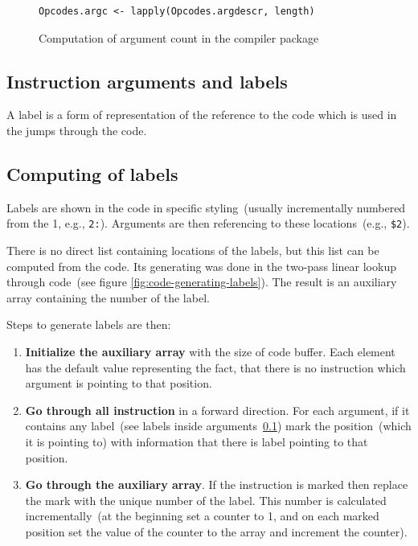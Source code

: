 \documentclass[thesis=M,english]{FITthesis}[2018/10/20]
\newcommand{\code}[1]{\texttt{#1}}
\begin{document}
\begin{figure}[!h]
\begin{lstlisting}
Opcodes.argc <- lapply(Opcodes.argdescr, length)
\end{lstlisting}
	\caption{Computation of argument count in the compiler package}\label{fig:computation-of-argc}
\end{figure}

\subsection{Instruction arguments and labels}\label{instruction-arguments-labels}

A label is a form of representation of the reference to the code which is used in the jumps through the code.

\subsection{Computing of labels}

Labels are shown in the code in specific styling~(usually incrementally numbered from the 1, e.g., \code{2:}). Arguments are then referencing to these locations~(e.g., \code{{\$}2}).

There is no direct list containing locations of the labels, but this list can be computed from the code. Its generating was done in the two-pass linear lookup through code~(see figure \ref{fig:code-generating-labels}). The result is an auxiliary array containing the number of the label.

Steps to generate labels are then:
\begin{enumerate}
	\item \textbf{Initialize the auxiliary array} with the size of code buffer. Each element has the default value representing the fact, that there is no instruction which argument is pointing to that position.
	\item \textbf{Go through all instruction} in a forward direction. For each argument, if it contains any label~(see labels inside arguments~\ref{instruction-arguments-labels}) mark the position~(which it is pointing to) with information that there is label pointing to that position.
	\item \textbf{Go through the auxiliary array}. If the instruction is marked then replace the mark with the unique number of the label. This number is calculated incrementally~(at the beginning set a counter to 1, and on each marked position set the value of the counter to the array and increment the counter).
\end{enumerate}
\end{document}
